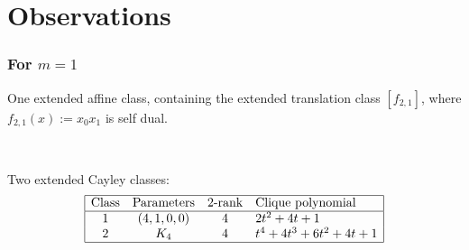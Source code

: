 \documentclass[pdf,sprung,slideColor,nocolorBG]{beamer}
\newenvironment{colortheme}[1]{
\def\ProvidesPackageRCS $##1${\relax}
\renewcommand{\ProcessOptions}{\relax}
\makeatletter

\makeatother
}{}
\begin{document}
\section{Observations}
\begin{colortheme}{jubata}
\begin{frame}
\frametitle{For $m=1$}

One extended affine class, containing the extended translation class $[f_{2,1}]$,
where $f_{2,1}(x) := x_0 x_1$ is self dual.

~

Two extended Cayley classes:
\begin{align*}
\begin{array}{|cccl|}
\hline
\text{Class} &
\text{Parameters} & 
\text{2-rank} &
\text{Clique polynomial}
\\
\hline
1 &
(4, 1, 0, 0) & 4 & 
2t^{2} + 4t + 1
\\
2 &
K_4 & 4 & 
t^{4} + 4t^{3} + 6t^{2} + 4t + 1
\\
\hline
\end{array}
\end{align*}


\end{frame}
\end{colortheme}
\end{document}
